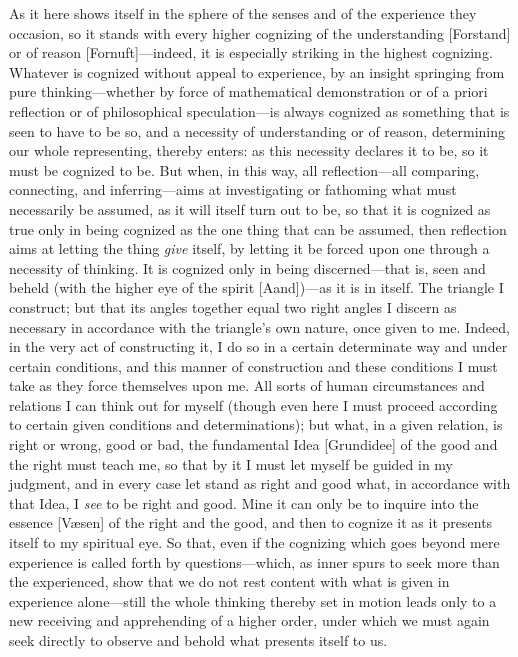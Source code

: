 \documentclass[12pt,a4paper]{book}
\begin{document}
As it here shows itself in the sphere of the senses and of the experience they
occasion, so it stands with every higher cognizing of the understanding
[Forstand] or of reason [Fornuft]---indeed, it is especially striking in the
highest cognizing. Whatever is cognized without appeal to experience, by an
insight springing from pure thinking---whether by force of mathematical
demonstration or of a priori reflection or of philosophical speculation---is
always cognized as something that is seen to have to be so, and a necessity of
understanding or of reason, determining our whole representing, thereby enters:
as this necessity declares it to be, so it must be cognized to be. But when, in
this way, all reflection---all comparing, connecting, and inferring---aims at
investigating or fathoming what must necessarily be assumed, as it will itself
turn out to be, so that it is cognized as true only in being cognized as the
one thing that can be assumed, then reflection aims at letting the thing
\emph{give} itself, by letting it be forced upon one through a necessity of
thinking. It is cognized only in being discerned---that is, seen and beheld
(with the higher eye of the spirit [Aand])---as it is in itself. The triangle I
construct; but that its angles together equal two right angles I discern as
necessary in accordance with the triangle's own nature, once given to me.
Indeed, in the very act of constructing it, I do so in a certain determinate way
and under certain conditions, and this manner of construction and these
conditions I must take as they force themselves upon me. All sorts of human
circumstances and relations I can think out for myself (though even here I must
proceed according to certain given conditions and determinations); but what, in
a given relation, is right or wrong, good or bad, the fundamental Idea
[Grundidee] of the good and the right must teach me, so that by it I must let
myself be guided in my judgment, and in every case let stand as right and good
what, in accordance with that Idea, I \emph{see} to be right and good. Mine it can only
be to inquire into the essence [Væsen] of the right and the good, and then to
cognize it as it presents itself to my spiritual eye. So that, even if the
cognizing which goes beyond mere experience is called forth by questions---which,
as inner spurs to seek more than the experienced, show that we do not rest
content with what is given in experience alone---still the whole thinking
thereby set in motion leads only to a new receiving and apprehending of a
higher order, under which we must again seek directly to observe and behold what
presents itself to us.
\end{document}
